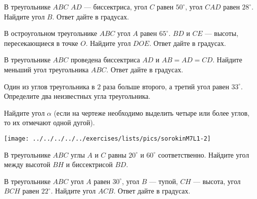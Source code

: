 %
%

\begin{class}[number=1]
	\begin{listofex}
		\item В треугольнике \( ABC \) \( AD \)  — биссектриса, угол \( C \) равен \( 50^{\circ} \), угол \( CAD \) равен \( 28^{\circ} \). Найдите угол \( B \). Ответ дайте в градусах.
		\item В остроугольном треугольнике \( ABC \) угол \( A \) равен \( 65^{\circ} \). \( BD \) и \( CE \)  — высоты, пересекающиеся в точке \( O \). Найдите угол \( DOE \). Ответ дайте в градусах.
		\item В треугольнике \( ABC \) проведена биссектриса \( AD \) и \( AB = AD = CD \). Найдите меньший угол треугольника \( ABC \). Ответ дайте в градусах.
		\item Один из углов треугольника в \( 2 \) раза больше второго, а третий угол равен \(  33^{\circ} \). Определите два неизвестных угла треугольника.
		\item
		\begin{minipage}[t]{\bodywidth}
			Найдите угол \( \alpha \) (если на чертеже необходимо выделить четыре или более углов, то их отмечают одной дугой).
		\end{minipage}
		\hspace{0.02\linewidth}
		\begin{minipage}[t]{\picwidth}
			\texttt{[image: ../../../../../exercises/lists/pics/sorokinM7L1-2]}
		\end{minipage}
		\item В треугольнике \( ABC \) углы \( A \) и \( C \) равны \( 20^{\circ } \) и \( 60^{\circ} \) соответственно. Найдите угол между высотой \( BH \) и биссектрисой \( BD \). 
		\item В треугольнике \( ABC \) угол \( A \) равен \( 30^{\circ} \), угол \( B \)  — тупой, \( CH \)  — высота, угол \( BCH  \) равен \( 22^{\circ} \). Найдите угол \( ACB \). Ответ дайте в градусах.
	\end{listofex}
\end{class}

